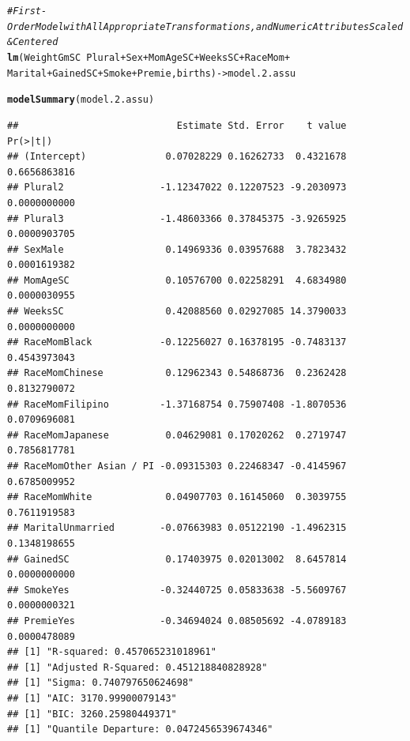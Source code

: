 \documentclass{article}\usepackage[]{graphicx}\usepackage[]{xcolor}
\makeatletter
\newcommand{\hlcom}[1]{\textcolor[rgb]{0.678,0.584,0.686}{\textit{#1}}}%
\newcommand{\hlopt}[1]{\textcolor[rgb]{0,0,0}{#1}}%
\newcommand{\hlstd}[1]{\textcolor[rgb]{0.345,0.345,0.345}{#1}}%
\newcommand{\hlkwb}[1]{\textcolor[rgb]{0.69,0.353,0.396}{#1}}%
\newcommand{\hlkwd}[1]{\textcolor[rgb]{0.737,0.353,0.396}{\textbf{#1}}}%
\newenvironment{kframe}{%
 \def\at@end@of@kframe{}%
 \ifinner\ifhmode%
  \def\at@end@of@kframe{\end{minipage}}%
  \begin{minipage}{\columnwidth}%
 \fi\fi%
 \def\FrameCommand##1{\hskip\@totalleftmargin \hskip-\fboxsep
 \colorbox{shadecolor}{##1}\hskip-\fboxsep
     \hskip-\linewidth \hskip-\@totalleftmargin \hskip\columnwidth}%
 \MakeFramed {\advance\hsize-\width
   \@totalleftmargin\z@ \linewidth\hsize
   \@setminipage}}%
 {\par\unskip\endMakeFramed%
 \at@end@of@kframe}
\newenvironment{knitrout}{}{} %
\makeatother
\begin{document}
\begin{knitrout}
\color{fgcolor}\begin{kframe}
\begin{alltt}
\hlcom{#First-Order Model with All Appropriate Transformations, and Numeric Attributes Scaled & Centered}
\hlkwd{lm}\hlstd{(WeightGmSC} \hlopt{~} \hlstd{Plural} \hlopt{+} \hlstd{Sex} \hlopt{+} \hlstd{MomAgeSC} \hlopt{+} \hlstd{WeeksSC} \hlopt{+} \hlstd{RaceMom} \hlopt{+}
     \hlstd{Marital} \hlopt{+} \hlstd{GainedSC} \hlopt{+} \hlstd{Smoke} \hlopt{+} \hlstd{Premie, births)} \hlkwb{->} \hlstd{model.2.assu}

\hlkwd{modelSummary}\hlstd{(model.2.assu)}
\end{alltt}
\begin{verbatim}
##                            Estimate Std. Error    t value     Pr(>|t|)
## (Intercept)              0.07028229 0.16262733  0.4321678 0.6656863816
## Plural2                 -1.12347022 0.12207523 -9.2030973 0.0000000000
## Plural3                 -1.48603366 0.37845375 -3.9265925 0.0000903705
## SexMale                  0.14969336 0.03957688  3.7823432 0.0001619382
## MomAgeSC                 0.10576700 0.02258291  4.6834980 0.0000030955
## WeeksSC                  0.42088560 0.02927085 14.3790033 0.0000000000
## RaceMomBlack            -0.12256027 0.16378195 -0.7483137 0.4543973043
## RaceMomChinese           0.12962343 0.54868736  0.2362428 0.8132790072
## RaceMomFilipino         -1.37168754 0.75907408 -1.8070536 0.0709696081
## RaceMomJapanese          0.04629081 0.17020262  0.2719747 0.7856817781
## RaceMomOther Asian / PI -0.09315303 0.22468347 -0.4145967 0.6785009952
## RaceMomWhite             0.04907703 0.16145060  0.3039755 0.7611919583
## MaritalUnmarried        -0.07663983 0.05122190 -1.4962315 0.1348198655
## GainedSC                 0.17403975 0.02013002  8.6457814 0.0000000000
## SmokeYes                -0.32440725 0.05833638 -5.5609767 0.0000000321
## PremieYes               -0.34694024 0.08505692 -4.0789183 0.0000478089
## [1] "R-squared: 0.457065231018961"
## [1] "Adjusted R-Squared: 0.451218840828928"
## [1] "Sigma: 0.740797650624698"
## [1] "AIC: 3170.99900079143"
## [1] "BIC: 3260.25980449371"
## [1] "Quantile Departure: 0.0472456539674346"
\end{verbatim}
\end{kframe}

\end{knitrout}
\end{document}
